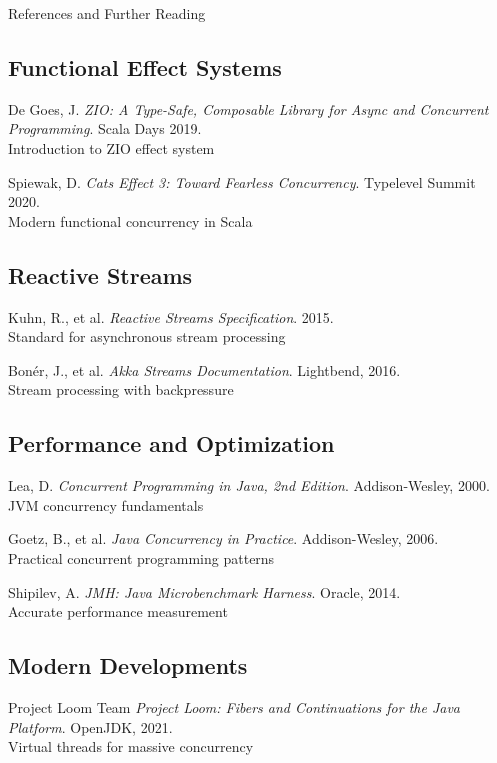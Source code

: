 \documentclass{beamer}
\begin{document}
\begin{frame}[allowframebreaks]{References and Further Reading}
\begin{thebibliography}{15}
\subsection*{Functional Effect Systems}
\textcolor{pureblue}{De Goes, J.} 
\textit{ZIO: A Type-Safe, Composable Library for Async and Concurrent Programming}. Scala Days 2019.
\footnotesize{\\ \color{gray}Introduction to ZIO effect system}

\textcolor{pureblue}{Spiewak, D.} 
\textit{Cats Effect 3: Toward Fearless Concurrency}. Typelevel Summit 2020.
\footnotesize{\\ \color{gray}Modern functional concurrency in Scala}

\subsection*{Reactive Streams}
\textcolor{pureblue}{Kuhn, R., et al.} 
\textit{Reactive Streams Specification}. 2015.
\footnotesize{\\ \color{gray}Standard for asynchronous stream processing}

\textcolor{pureblue}{Bonér, J., et al.} 
\textit{Akka Streams Documentation}. Lightbend, 2016.
\footnotesize{\\ \color{gray}Stream processing with backpressure}

\subsection*{Performance and Optimization}
\textcolor{pureblue}{Lea, D.} 
\textit{Concurrent Programming in Java, 2nd Edition}. Addison-Wesley, 2000.
\footnotesize{\\ \color{gray}JVM concurrency fundamentals}

\textcolor{pureblue}{Goetz, B., et al.} 
\textit{Java Concurrency in Practice}. Addison-Wesley, 2006.
\footnotesize{\\ \color{gray}Practical concurrent programming patterns}

\textcolor{pureblue}{Shipilev, A.} 
\textit{JMH: Java Microbenchmark Harness}. Oracle, 2014.
\footnotesize{\\ \color{gray}Accurate performance measurement}

\subsection*{Modern Developments}
\textcolor{pureblue}{Project Loom Team} 
\textit{Project Loom: Fibers and Continuations for the Java Platform}. OpenJDK, 2021.
\footnotesize{\\ \color{gray}Virtual threads for massive concurrency}


\end{thebibliography}
\end{frame}
\end{document}
